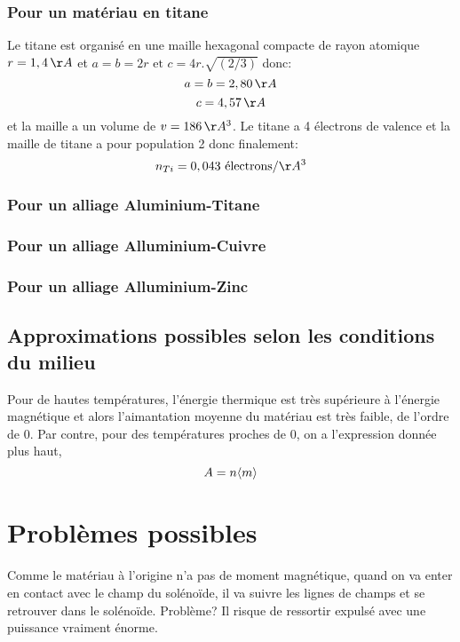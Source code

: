 \documentclass{article}
\begin{document}
\subsubsection{Pour un matériau en titane}
Le titane est organisé en une maille hexagonal compacte de rayon atomique $r=1,4 \,\AA$ et $a = b = 2r \mbox{ et }c = 4r.\sqrt{(2 / 3)}$ donc:
$$a=b=2,80\,\AA$$
$$c=4,57\,\AA$$
et la maille a un volume de $v = 186\,\AA^3$. Le titane a 4 électrons de valence et la maille de titane a pour population 2 donc finalement:
$$n_{Ti} = 0,043 \text{ électrons} / \AA^3$$

\subsubsection{Pour un alliage Aluminium-Titane}

\subsubsection{Pour un alliage Alluminium-Cuivre}

\subsubsection{Pour un alliage Alluminium-Zinc}

\subsection{Approximations possibles selon les conditions du milieu}
Pour de hautes températures, l'énergie thermique est très supérieure à l'énergie magnétique et alors l'aimantation moyenne du matériau est très faible, de l'ordre de 0. Par contre, pour des températures proches de 0, on a l'expression donnée plus haut, $$A = n \valmoy{m}$$

\section{Problèmes possibles}
Comme le matériau à l'origine n'a pas de moment magnétique, quand on va enter en contact avec le champ du solénoïde, il va suivre les lignes de champs et se retrouver dans le solénoïde. Problème? Il risque de ressortir expulsé avec une puissance vraiment énorme.
\end{document}
